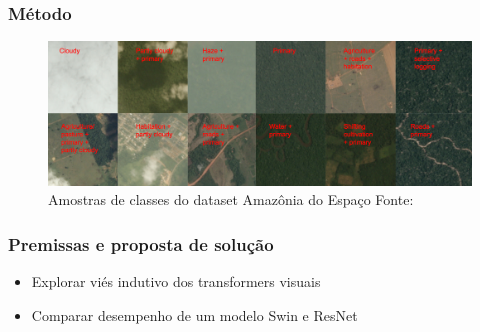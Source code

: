 \documentclass{beamer}
\begin{document}

\begin{frame}

\frametitle{Método}

\begin{figure}[!ht]
    \centering
    \includegraphics[width=0.9\columnwidth]{
        Imagens/chips.jpg
    }
    \caption{Amostras de classes do dataset Amazônia do Espaço Fonte:\cite{Kaggle:PlanetAmazonFromSpace}}\label{fig:dataset}
\end{figure}


\end{frame}



\begin{frame}
    \frametitle{Premissas e proposta de solução}
    \begin{itemize}
        \item Explorar viés indutivo dos transformers visuais
        \item Comparar desempenho de um modelo Swin e ResNet
    \end{itemize}
    
\end{frame}
\end{document}
